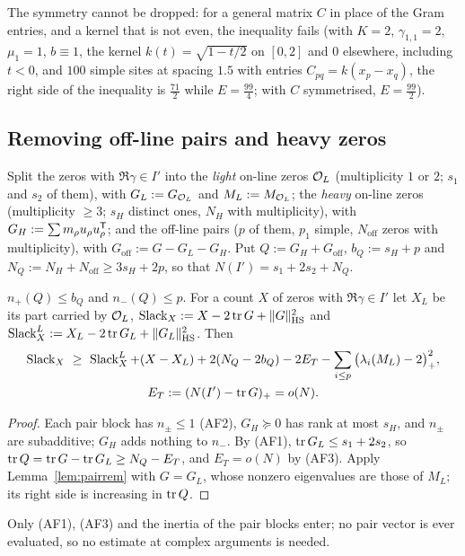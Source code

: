 The symmetry cannot be dropped: for a general matrix $C$ in place of the Gram entries, and a kernel that is not even, the inequality fails
(with $K=2$, $\gamma_{1,1}=2$, $\mu_1=1$, $b\equiv1$, the kernel $k(t)=\sqrt{1-t/2}$ on $[0,2]$ and $0$ elsewhere, including $t<0$, and $100$ simple
sites at spacing $1.5$ with entries $C_{pq}=k(x_p-x_q)$, the right side of the inequality is $\frac{71}2$ while $E=\frac{99}4$; with $C$
symmetrised, $E=\frac{99}2$).

\subsection{Removing off-line pairs and heavy zeros}\label{ssec:removal}
Split the zeros with $\Re\gamma\in I'$ into the \emph{light} on-line zeros $\mathcal O_L$ (multiplicity $1$ or $2$; $s_1$ and $s_2$ of them), with
$G_L:=G_{\mathcal O_L}$ and $M_L:=M_{\mathcal O_L}$; the \emph{heavy} on-line zeros (multiplicity $\ge3$; $s_H$ distinct ones, $N_H$ with multiplicity), with
$G_H:=\sum m_\rho u_\rho u_\rho^{\mathsf T}$; and the off-line pairs ($p$ of them, $p_1$ simple, $N_{\mathrm{off}}$ zeros with multiplicity), with
$G_{\mathrm{off}}:=G-G_L-G_H$. Put $Q:=G_H+G_{\mathrm{off}}$, $b_Q:=s_H+p$ and $N_Q:=N_H+N_{\mathrm{off}}\ge3s_H+2p$, so that
$N(I')=s_1+2s_2+N_Q$.

\begin{lemma}\label{lem:removal}
$n_+(Q)\le b_Q$ and $n_-(Q)\le p$. For a count $X$ of zeros with $\Re\gamma\in I'$ let $X_L$ be its part carried by $\mathcal O_L$,
$\operatorname{Slack}_X:=X-2\operatorname{tr} G+\lVert G\rVert_{\mathrm{HS}}^2$ and $\operatorname{Slack}^L_X:=X_L-2\operatorname{tr} G_L+\lVert G_L\rVert_{\mathrm{HS}}^2$. Then
\begin{gather*}
\operatorname{Slack}_X\ \ge\ \operatorname{Slack}^L_X+(X-X_L)+2(N_Q-2b_Q)-2E_T-\sum_{i\le p}\big(\lambda_i(M_L)-2\big)_+^2,\\
E_T:=(N(I')-\operatorname{tr} G)_+=o(N).
\end{gather*}
\end{lemma}

\begin{proof}
Each pair block has $n_\pm\le1$ (AF2), $G_H\succeq0$ has rank at most $s_H$, and $n_\pm$ are subadditive; $G_H$ adds nothing to $n_-$. By (AF1),
$\operatorname{tr} G_L\le s_1+2s_2$, so $\operatorname{tr} Q=\operatorname{tr} G-\operatorname{tr} G_L\ge N_Q-E_T$, and $E_T=o(N)$ by (AF3). Apply Lemma~\ref{lem:pairrem} with $G=G_L$, whose nonzero
eigenvalues are those of $M_L$; its right side is increasing in $\operatorname{tr} Q$.
\end{proof}

Only (AF1), (AF3) and the inertia of the pair blocks enter; no pair vector is ever evaluated, so no estimate at complex arguments is needed.

